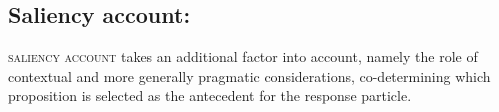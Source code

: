 \documentclass[output=paper,colorlinks,citecolor=brown]{langscibook}
\begin{document}




\subsection{Saliency account: \citet{hrd+:krifka13}}\label{hrdsim:sec:saliencyaccount}

 \textsc{saliency account} takes an additional factor into account, namely the role of contextual and more generally pragmatic considerations, co-deter\-min\-ing which proposition is selected as the antecedent for the response particle.
\end{document}
